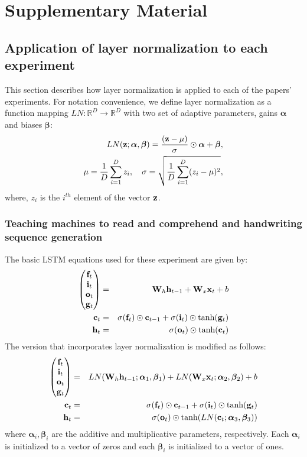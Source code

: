 \documentclass{article}
\newcommand{\real}{\mathbb{R}}
\begin{document}
\section*{Supplementary Material}

\subsection*{Application of layer normalization to each experiment}

This section describes how layer normalization is applied to each of the papers' experiments. For notation convenience, we define layer normalization as a function mapping $LN: \real^D \to \real^D$ with two set of adaptive parameters, gains $\bm{\alpha}$ and biases $\bm{\beta}$:
\begin{eqnarray}
LN({\bf z} ; \bm{\alpha}, \bm{\beta}) = \frac{({\bf z} - \mu)}{\sigma} \odot \bm{\alpha} + \bm{\beta}, \\
\mu = \frac{1}{D}\sum_{i=1}^D z_i, \quad \sigma = \sqrt{\frac{1}{D}\sum_{i=1}^D (z_i-\mu)^2}, 
\end{eqnarray}
where, $z_i$ is the $i^{th}$ element of the vector ${\bf z}$.

\subsubsection*{Teaching machines to read and comprehend and handwriting sequence generation}

The basic LSTM equations used for these experiment are given by:
\begin{eqnarray}
\begin{pmatrix}{\bf f}_t\\{\bf i}_t\\{\bf o}_t\\{\bf g}_t\end{pmatrix} &=& {\bf W}_h {\bf h}_{t-1} + {\bf W}_x {\bf x}_t + b \\
{\bf c}_t &=& \sigma({\bf f}_t) \odot {\bf c}_{t-1} + \sigma({\bf i}_t) \odot \text{tanh}({\bf g}_t) \\
{\bf h}_t &=& \sigma({\bf o}_t) \odot \text{tanh}({\bf c}_t)
\end{eqnarray}
The version that incorporates layer normalization is modified as follows:
\begin{eqnarray}
\begin{pmatrix}{\bf f}_t\\{\bf i}_t\\{\bf o}_t\\{\bf g}_t\end{pmatrix} &=& LN({\bf W}_h {\bf h}_{t-1}; \bm{\alpha}_1, \bm{\beta}_1) + LN({\bf W}_x {\bf x}_t; \bm{\alpha}_2, \bm{\beta}_2) + b \\
{\bf c}_t &=& \sigma({\bf f}_t) \odot {\bf c}_{t-1} + \sigma({\bf i}_t) \odot \text{tanh}({\bf g}_t) \\
{\bf h}_t &=& \sigma({\bf o}_t) \odot \text{tanh}(LN({\bf c}_t; \bm{\alpha}_3, \bm{\beta}_3))
\end{eqnarray}
where $\bm{\alpha}_i, \bm{\beta}_i$ are the additive and multiplicative parameters, respectively. Each $\bm{\alpha}_i$ is initialized to a vector of zeros and each $\bm{\beta}_i$ is initialized to a vector of ones.
\end{document}
